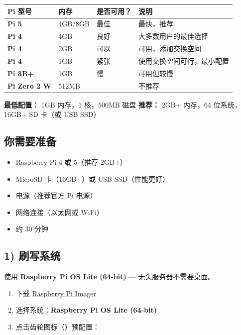 \begin{table}[h]
\centering
\small
\begin{tabular}{|l|l|l|l|}
\hline
Pi 型号 & 内存 & 是否可用？ & 说明 \\
\hline
\textbf{Pi 5} & 4GB/8GB & \emoji{✅} 最佳 & 最快，推荐 \\
\hline
\textbf{Pi 4} & 4GB & \emoji{✅} 良好 & 大多数用户的最佳选择 \\
\hline
\textbf{Pi 4} & 2GB & \emoji{✅} 可以 & 可用，添加交换空间 \\
\hline
\textbf{Pi 4} & 1GB & \emoji{⚠} 紧张 & 使用交换空间可行，最小配置 \\
\hline
\textbf{Pi 3B+} & 1GB & \emoji{⚠} 慢 & 可用但较慢 \\
\hline
\textbf{Pi Zero 2 W} & 512MB & \emoji{❌} & 不推荐 \\
\hline
\end{tabular}
\end{table}



\textbf{最低配置：} 1GB 内存，1 核，500MB 磁盘
\textbf{推荐：} 2GB+ 内存，64 位系统，16GB+ SD 卡（或 USB SSD）

\subsection{你需要准备}


\begin{itemize}
  \item Raspberry Pi 4 或 5（推荐 2GB+）
  \item MicroSD 卡（16GB+）或 USB SSD（性能更好）
  \item 电源（推荐官方 Pi 电源）
  \item 网络连接（以太网或 WiFi）
  \item 约 30 分钟
\end{itemize}


\subsection{1) 刷写系统}


使用 \textbf{Raspberry Pi OS Lite (64-bit)} — 无头服务器不需要桌面。

\begin{enumerate}
  \item 下载 \href{https://www.raspberrypi.com/software/}{Raspberry Pi Imager}
  \item 选择系统：\textbf{Raspberry Pi OS Lite (64-bit)}
  \item 点击齿轮图标（）预配置：
\end{enumerate}

